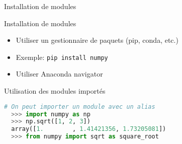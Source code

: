 \begin{frame}[fragile]{Installation de modules}

  \begin{block}{Installation de modules}
    \medskip
    \begin{itemize}
      \item Utiliser un gestionnaire de paquets (pip, conda, etc.)
      \item Exemple: \texttt{pip install numpy}
      \item Utiliser Anaconda navigator
    \end{itemize}
  \end{block}


\begin{block}{Utilisation des modules importés}
  \begin{lstlisting}[language=Python, numbers=none]
  # On peut importer un module avec un alias
  >>> import numpy as np
  >>> np.sqrt([1, 2, 3])
  array([1.        , 1.41421356, 1.73205081])
  >>> from numpy import sqrt as square_root
\end{lstlisting}
\end{block}

\end{frame}


